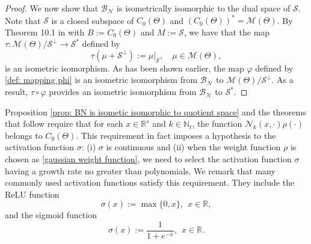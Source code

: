 \documentclass[11pt]{article}
\begin{document}
\begin{proof}
We now show that $\mathcal{B}_{\mathcal{N}}$ is isometrically isomorphic to the dual space of $\mathcal{S}$. Note that $\mathcal{S}$ is a closed subspace of $C_0(\Theta)$ and $(C_0(\Theta))^*=\mathcal{M}(\Theta)$. By Theorem 10.1 in \cite{conway2019course} with $B:=C_0(\Theta)$ and $M:=\mathcal{S}$, we have that the map $\tau:\mathcal{M}(\Theta)/\mathcal{S}^\perp\to \mathcal{S}^*$ defined by 
    \begin{equation*}\label{pho}
        \tau(\mu+\mathcal{S}^\perp):=\mu|_{\mathcal{S}},\quad\mu\in\mathcal{M}(\Theta),
    \end{equation*}
is an isometric isomorphism. 
As has been shown earlier, %
the map $\varphi$ defined by
\eqref{def: mapping phi} is an isometric isomorphism from $\mathcal{B}_{\mathcal{N}}$ to $\mathcal{M}(\Theta)/\mathcal{S}^\perp$. As a result, $\tau\circ\varphi$ provides an isometric isomorphism from  $\mathcal{B}_{\mathcal{N}}$ to $\mathcal{S}^*$. 
\end{proof}

Proposition \ref{prop: BN is isometic isomorphic to quotient space} and the theorems that follow require that for each $x\in \mathbb{R}^s$ and $k\in\mathbb{N}_t$, the function $\mathcal{N}_k({x},\cdot)\rho(\cdot)$ belongs to $C_0(\Theta)$.
This requirement in fact imposes a hypothesis to the activation function $\sigma$: (i) $\sigma$ is continuous and (ii) when the weight function $\rho$ is chosen as \eqref{gaussian weight function}, we need to select the activation function $\sigma$ having a growth rate no greater than polynomials. We remark that many commonly used activation functions satisfy this requirement. They include the ReLU function 
$$
\sigma(x):=\max\{0,x\},\ \ x\in\mathbb{R},
$$ 
and the sigmoid function 
$$
\sigma(x):=\frac{1}{1+e^{-x}},\ \ x\in\mathbb{R}.
$$
\end{document}
